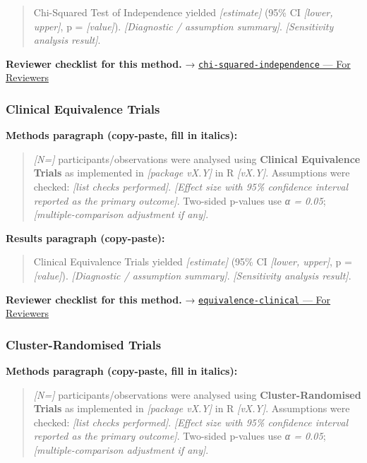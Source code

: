 \documentclass[
]{article}
\begin{document}
\begin{quote}
Chi-Squared Test of Independence yielded \emph{{[}estimate{]}} (95\% CI
\emph{{[}lower, upper{]}}, p = \emph{{[}value{]}}). \emph{{[}Diagnostic
/ assumption summary{]}}. \emph{{[}Sensitivity analysis result{]}}.
\end{quote}

\textbf{Reviewer checklist for this method.} →
\href{../chapters/04-inferential/chi-squared-independence.Rmd\#for-reviewers}{\texttt{chi-squared-independence}
--- For Reviewers}

\subsubsection{Clinical Equivalence
Trials}\label{clinical-equivalence-trials}

\textbf{Methods paragraph (copy-paste, fill in italics):}

\begin{quote}
\emph{{[}N={]}} participants/observations were analysed using
\textbf{Clinical Equivalence Trials} as implemented in \emph{{[}package
vX.Y{]}} in R \emph{{[}vX.Y{]}}. Assumptions were checked: \emph{{[}list
checks performed{]}}. \emph{{[}Effect size with 95\% confidence interval
reported as the primary outcome{]}}. Two-sided p-values use \emph{α =
0.05}; \emph{{[}multiple-comparison adjustment if any{]}}.
\end{quote}

\textbf{Results paragraph (copy-paste):}

\begin{quote}
Clinical Equivalence Trials yielded \emph{{[}estimate{]}} (95\% CI
\emph{{[}lower, upper{]}}, p = \emph{{[}value{]}}). \emph{{[}Diagnostic
/ assumption summary{]}}. \emph{{[}Sensitivity analysis result{]}}.
\end{quote}

\textbf{Reviewer checklist for this method.} →
\href{../chapters/14-clinical/equivalence-clinical.Rmd\#for-reviewers}{\texttt{equivalence-clinical}
--- For Reviewers}

\subsubsection{Cluster-Randomised
Trials}\label{cluster-randomised-trials}

\textbf{Methods paragraph (copy-paste, fill in italics):}

\begin{quote}
\emph{{[}N={]}} participants/observations were analysed using
\textbf{Cluster-Randomised Trials} as implemented in \emph{{[}package
vX.Y{]}} in R \emph{{[}vX.Y{]}}. Assumptions were checked: \emph{{[}list
checks performed{]}}. \emph{{[}Effect size with 95\% confidence interval
reported as the primary outcome{]}}. Two-sided p-values use \emph{α =
0.05}; \emph{{[}multiple-comparison adjustment if any{]}}.
\end{quote}
\end{document}
